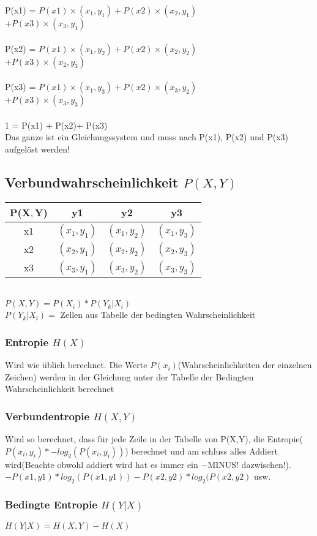 \colorbox{lightlightgrey}{P(x1) = $P(x1) \times (x_1,y_1) + P(x2) \times (x_2,y_1) $}\\\colorbox{lightlightgrey}{$ + P(x3) \times (x_3,y_1)$}\\\\
\colorbox{lightlightgrey}{P(x2) = $P(x1) \times (x_1,y_2) + P(x2) \times (x_2,y_2) $}\\\colorbox{lightlightgrey}{$ + P(x3) \times (x_2,y_3)$}\\\\
\colorbox{lightlightgrey}{P(x3) = $P(x1) \times (x_1,y_3) + P(x2) \times (x_3,y_2) $}\\\colorbox{lightlightgrey}{$ + P(x3) \times (x_3,y_3)$}\\\\
\colorbox{lightlightgrey}{1 = P(x1) + P(x2)+ P(x3)}\\
Das ganze ist ein Gleichungssystem und muss nach P(x1), P(x2) und P(x3) aufgelöst werden!


\subsection{Verbundwahrscheinlichkeit $P(X,Y)$}
\begin{center}
\begin{tabular}{ |c|c|c|c| }
    \hline
    P(X$,$Y) & y1 & y2 & y3\\
    \hline
    x1 & $(x_1,y_1)$ & $(x_1,y_2)$ & $(x_1,y_3)$\\
    \hline
    x2 & $(x_2,y_1)$ & $(x_2,y_2)$ & $(x_2,y_3)$\\
    \hline
    x3 & $(x_3,y_1)$ & $(x_3,y_2)$ & $(x_3,y_3)$ \\
    \hline
\end{tabular}
\end{center}\\

\colorbox{lightlightgrey}{$P(X,Y) = P(X_i) * P(Y_k | X_i)$}\\
$P(Y_k | X_i) = $ Zellen aus Tabelle der bedingten Wahrscheinlichkeit
\subsubsection{Entropie $H(X)$}
Wird wie üblich berechnet. Die Werte $P(x_i)$(Wahrscheinlichkeiten der einzelnen Zeichen) werden in der Gleichung unter der Tabelle der Bedingten Wahrscheinlichkeit berechnet
\subsubsection{Verbundentropie $H(X,Y)$}
Wird so berechnet, dass für jede Zeile in der Tabelle von P(X,Y), die Entropie(\colorbox{lightlightgrey}{$P(x_i,y_i)*-log_2(P(x_i, y_i))$}) berechnet und am schluss alles Addiert wird(Beachte obwohl addiert wird hat es immer ein $-$MINUS! dazwischen!).\\
\colorbox{lightlightgrey}{$-P(x1,y1) * log_2(P(x1,y1)) - P(x2,y2) * log_2(P(x2,y2)$ usw.}
\subsubsection{Bedingte Entropie $H(Y|X)$}
\colorbox{lightlightgrey}{$H(Y|X) = H(X,Y) - H(X)$}











\vfill
$$
\columnbreak